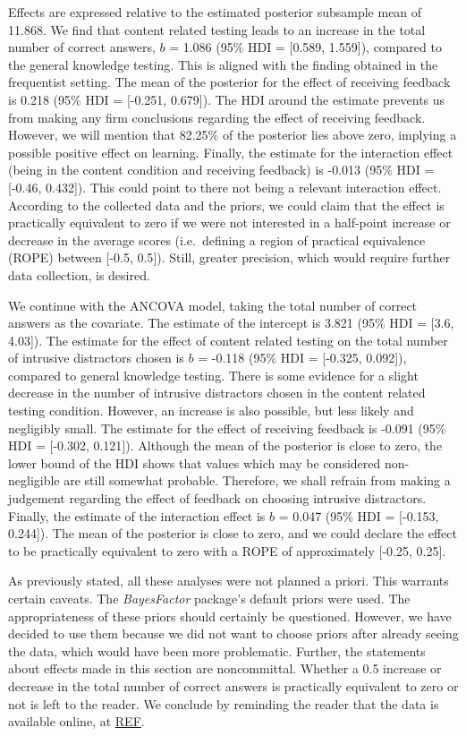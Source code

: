 \documentclass[../main.tex]{subfiles}
\begin{document}
Effects are expressed relative to the estimated posterior subsample mean
of 11.868. We find that content related testing leads to an increase in
the total number of correct answers, \(b\) = 1.086 (95\% HDI = {[}0.589,
1.559{]}), compared to the general knowledge testing. This is aligned
with the finding obtained in the frequentist setting. The mean of the
posterior for the effect of receiving feedback is 0.218 (95\% HDI =
{[}-0.251, 0.679{]}). The HDI around the estimate prevents us from
making any firm conclusions regarding the effect of receiving feedback.
However, we will mention that 82.25\% of the posterior lies above zero,
implying a possible positive effect on learning. Finally, the estimate
for the interaction effect (being in the content condition and receiving
feedback) is -0.013 (95\% HDI = {[}-0.46, 0.432{]}). This could point to
there not being a relevant interaction effect. According to the
collected data and the priors, we could claim that the effect is
practically equivalent to zero if we were not interested in a half-point
increase or decrease in the average scores (i.e.~defining a region of
practical equivalence (ROPE) between {[}-0.5, 0.5{]}). Still, greater
precision, which would require further data collection, is desired.

We continue with the ANCOVA model, taking the total number of correct
answers as the covariate. The estimate of the intercept is 3.821 (95\%
HDI = {[}3.6, 4.03{]}). The estimate for the effect of content related
testing on the total number of intrusive distractors chosen is \(b\) =
-0.118 (95\% HDI = {[}-0.325, 0.092{]}), compared to general knowledge
testing. There is some evidence for a slight decrease in the number of
intrusive distractors chosen in the content related testing condition.
However, an increase is also possible, but less likely and negligibly
small. The estimate for the effect of receiving feedback is -0.091 (95\%
HDI = {[}-0.302, 0.121{]}). Although the mean of the posterior is close
to zero, the lower bound of the HDI shows that values which may be
considered non-negligible are still somewhat probable. Therefore, we
shall refrain from making a judgement regarding the effect of feedback
on choosing intrusive distractors. Finally, the estimate of the
interaction effect is \(b\) = 0.047 (95\% HDI = {[}-0.153, 0.244{]}).
The mean of the posterior is close to zero, and we could declare the
effect to be practically equivalent to zero with a ROPE of approximately
{[}-0.25, 0.25{]}.

As previously stated, all these analyses were not planned a priori. This
warrants certain caveats. The \textit{BayesFactor} package's default
priors were used. The appropriateness of these priors should certainly
be questioned. However, we have decided to use them because we did not
want to choose priors after already seeing the data, which would have
been more problematic. Further, the statements about effects made in
this section are noncommittal. Whether a 0.5 increase or decrease in the
total number of correct answers is practically equivalent to zero or not
is left to the reader. We conclude by reminding the reader that the data
is available online, at \url{REF}.
\end{document}
